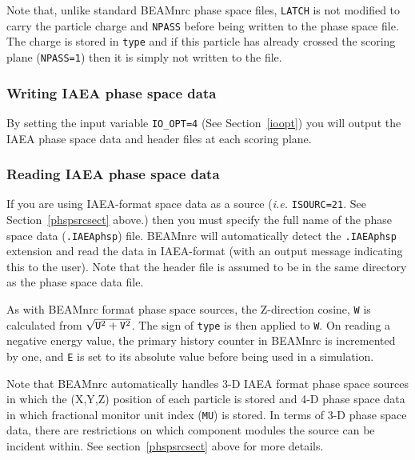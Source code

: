 \documentclass[12pt,twoside]{article}
\begin{document}
Note that, unlike standard BEAMnrc phase space files, {\tt LATCH} is not modified to
carry the particle charge and {\tt NPASS} before being written to the phase space file.
The charge is stored in {\tt type} and if this particle has already crossed the
scoring plane ({\tt NPASS=1}) then it is simply not written to the file.

\subsubsection{Writing IAEA phase space data}

By setting the input variable {\tt IO\_OPT=4} (See Section~\ref{ioopt}) you will
output the IAEA phase space data and header files at each scoring plane.

\subsubsection{Reading IAEA phase space data}

If you are using IAEA-format space data as a source ({\em i.e.} {\tt ISOURC=21}.
See Section~\ref{phspsrcsect} above.) then you must specify the full name of the
phase space data ({\tt .IAEAphsp}) file.  BEAMnrc will automatically detect the
{\tt .IAEAphsp} extension and read the data in IAEA-format (with an output message
indicating this to the user).  Note that the header file is assumed to be in the
same directory as the phase space data file.

As with BEAMnrc format phase space sources, the Z-direction cosine, {\tt W} is
calculated from $\sqrt{{\tt U}^2+{\tt V}^2}$.  The sign of {\tt type} is then
applied to {\tt W}.  On reading a negative
energy value, the primary history counter in BEAMnrc is incremented by one, and {\tt E} is set
to its absolute value before being used in a simulation.

Note that BEAMnrc automatically handles 3-D IAEA format phase space sources in which the (X,Y,Z) position
of each particle is stored and 4-D phase space data in which fractional monitor unit index ({\tt MU}) is stored.
In terms of 3-D phase space data, there are restrictions on which component modules the source can
be incident within.  See section~\ref{phspsrcsect} above for more details.
\end{document}
